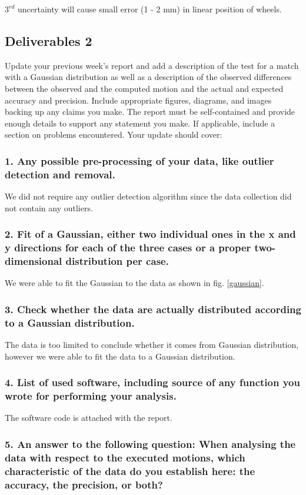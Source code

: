 $3^{rd}$ uncertainty will cause small error (1 - 2 mm) in linear position of wheels.

\sectionLine
\subsection*{Deliverables 2}
Update your previous week’s report and add a description of the test for a match with a Gaussian distribution as well as a description of the observed differences between the observed and the computed motion and the actual and expected accuracy and precision. Include appropriate figures, diagrams, and images backing up any claims you make. The report must be self-contained and provide enough details to support any statement you make. If applicable, include a section on problems encountered. Your update should cover:

\subsubsection*{1. Any possible pre-processing of your data, like outlier detection and removal.}
We did not require any outlier detection algorithm since the data collection did not contain any outliers.

\subsubsection*{2. Fit of a Gaussian, either two individual ones in the x and y directions for each of the three cases or a proper two-dimensional distribution per case.}
We were able to fit the Gaussian to the data as shown in fig. \ref{gaussian}.

\subsubsection*{3. Check whether the data are actually distributed according to a Gaussian distribution.}
The data is too limited to conclude whether it comes from Gaussian distribution, however we were able to fit the data to a Gaussian distribution.

\subsubsection*{4. List of used software, including source of any function you wrote for performing your analysis.}
The software code is attached with the report.

\subsubsection*{5. An answer to the following question: When analysing the data with respect to the executed motions, which characteristic of the data do you establish here: the accuracy, the precision, or both?}

